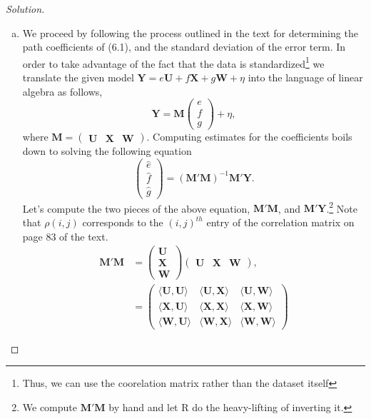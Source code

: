 \documentclass{amsart}
\newcommand{\bvec}[1]{{\boldsymbol #1}}
\begin{document}
			\begin{proof}[Solution] \
				\begin{enumerate}[(a)]
					\item We proceed by following the process outlined in the text for determining the path coefficients of (6.1), and the standard deviation of the error term.
					In order to take advantage of the fact that the data is standardized\footnote{Thus, we can use the coorelation matrix rather than the dataset itself} we translate the given model $\bvec{Y} = e\bvec{U} + f\bvec{X} + g\bvec{W} + \eta$ into the language of linear algebra as follows, $$\bvec{Y} = \bvec{M} \begin{pmatrix} e \\ f \\ g \end{pmatrix} + \eta,$$
					where $\bvec{M} = \begin{pmatrix}\bvec{U} & \bvec{X} & \bvec{W} \end{pmatrix}$.
					Computing estimates for the coefficients boils down to solving the following equation $$\begin{pmatrix} \hat{e} \\ \hat{f} \\ \hat{g} \end{pmatrix} = (\bvec{M}'\bvec{M})^{-1}\bvec{M}'\bvec{Y}.$$
					Let's compute the two pieces of the above equation, $\bvec{M}'\bvec{M}$, and $\bvec{M}'\bvec{Y}$.\footnote{We compute $\bvec{M}'\bvec{M}$ by hand and let R do the heavy-lifting of inverting it.} 
					Note that $\rho(i,j)$ corresponds to the $(i,j)^{th}$ entry of the correlation matrix on page 83 of the text.
						\begin{align*}
							\bvec{M}'\bvec{M} &= \begin{pmatrix} \bvec{U} \\ \bvec{X} \\ \bvec{W} \end{pmatrix} \begin{pmatrix} \bvec{U} & \bvec{X} & \bvec{W} \end{pmatrix}, \\
							&= \begin{pmatrix}
								\langle \bvec{U},\bvec{U} \rangle & \langle \bvec{U},\bvec{X} \rangle & \langle \bvec{U},\bvec{W} \rangle \\
								\langle \bvec{X},\bvec{U} \rangle & \langle \bvec{X},\bvec{X} \rangle & \langle \bvec{X},\bvec{W} \rangle \\
								\langle \bvec{W},\bvec{U} \rangle & \langle \bvec{W},\bvec{X} \rangle & \langle \bvec{W},\bvec{W} \rangle

\end{pmatrix}
\end{align*}
\end{enumerate}
\end{proof}
\end{document}
